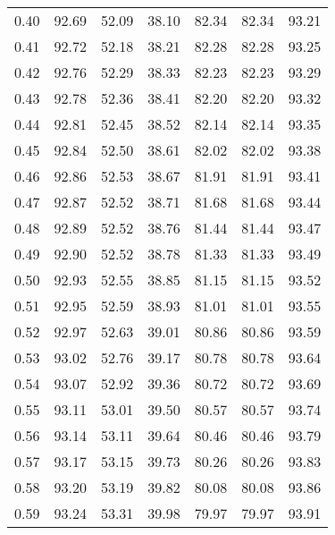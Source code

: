 \begin{tabular}{|c|c|c|c|c|c|c|}
      0.40 &     92.69 &     52.09 &      38.10 &   82.34 &      82.34 &         93.21 \\
      0.41 &     92.72 &     52.18 &      38.21 &   82.28 &      82.28 &         93.25 \\
      0.42 &     92.76 &     52.29 &      38.33 &   82.23 &      82.23 &         93.29 \\
      0.43 &     92.78 &     52.36 &      38.41 &   82.20 &      82.20 &         93.32 \\
      0.44 &     92.81 &     52.45 &      38.52 &   82.14 &      82.14 &         93.35 \\
      0.45 &     92.84 &     52.50 &      38.61 &   82.02 &      82.02 &         93.38 \\
      0.46 &     92.86 &     52.53 &      38.67 &   81.91 &      81.91 &         93.41 \\
      0.47 &     92.87 &     52.52 &      38.71 &   81.68 &      81.68 &         93.44 \\
      0.48 &     92.89 &     52.52 &      38.76 &   81.44 &      81.44 &         93.47 \\
      0.49 &     92.90 &     52.52 &      38.78 &   81.33 &      81.33 &         93.49 \\
      0.50 &     92.93 &     52.55 &      38.85 &   81.15 &      81.15 &         93.52 \\
      0.51 &     92.95 &     52.59 &      38.93 &   81.01 &      81.01 &         93.55 \\
      0.52 &     92.97 &     52.63 &      39.01 &   80.86 &      80.86 &         93.59 \\
      0.53 &     93.02 &     52.76 &      39.17 &   80.78 &      80.78 &         93.64 \\
      0.54 &     93.07 &     52.92 &      39.36 &   80.72 &      80.72 &         93.69 \\
      0.55 &     93.11 &     53.01 &      39.50 &   80.57 &      80.57 &         93.74 \\
      0.56 &     93.14 &     53.11 &      39.64 &   80.46 &      80.46 &         93.79 \\
      0.57 &     93.17 &     53.15 &      39.73 &   80.26 &      80.26 &         93.83 \\
      0.58 &     93.20 &     53.19 &      39.82 &   80.08 &      80.08 &         93.86 \\
      0.59 &     93.24 &     53.31 &      39.98 &   79.97 &      79.97 &         93.91 \\

\end{tabular}
